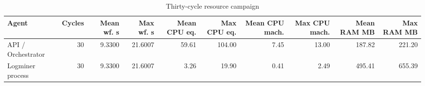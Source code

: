 \begin{table}[t]
\caption{Thirty-cycle resource campaign}
\label{tab:resource_campaign_full}
\centering
\scriptsize
\begin{tabular}{l r r r r r r r r r}
\toprule
\textbf{Agent} & \textbf{Cycles} & \textbf{Mean wf. s} & \textbf{Max wf. s} & \textbf{Mean CPU eq.} & \textbf{Max CPU eq.} & \textbf{Mean CPU mach.} & \textbf{Max CPU mach.} & \textbf{Mean RAM MB} & \textbf{Max RAM MB} \\
\midrule
API / Orchestrator & 30 & 9.3300 & 21.6007 & 59.61 & 104.00 & 7.45 & 13.00 & 187.82 & 221.20 \\
Logminer process & 30 & 9.3300 & 21.6007 & 3.26 & 19.90 & 0.41 & 2.49 & 495.41 & 655.39 \\
\bottomrule
\end{tabular}
\end{table}

